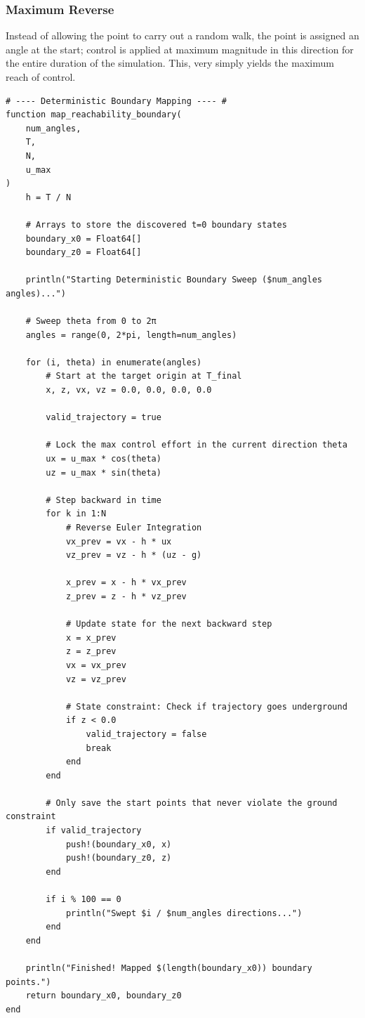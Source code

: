 \documentclass{article}
\begin{document}
\subsubsection{Maximum Reverse}
Instead of allowing the point to carry out a random walk, the point is assigned an angle at the start; control is applied at maximum magnitude in this direction for the entire duration of the simulation. This, very simply yields the maximum reach of control.

\begin{verbatim}
# ---- Deterministic Boundary Mapping ---- #
function map_reachability_boundary(
    num_angles, 
    T, 
    N, 
    u_max
)
    h = T / N
    
    # Arrays to store the discovered t=0 boundary states
    boundary_x0 = Float64[]
    boundary_z0 = Float64[]

    println("Starting Deterministic Boundary Sweep ($num_angles angles)...")

    # Sweep theta from 0 to 2π
    angles = range(0, 2*pi, length=num_angles)

    for (i, theta) in enumerate(angles)
        # Start at the target origin at T_final
        x, z, vx, vz = 0.0, 0.0, 0.0, 0.0
        
        valid_trajectory = true

        # Lock the max control effort in the current direction theta
        ux = u_max * cos(theta)
        uz = u_max * sin(theta)

        # Step backward in time
        for k in 1:N
            # Reverse Euler Integration
            vx_prev = vx - h * ux
            vz_prev = vz - h * (uz - g)
            
            x_prev = x - h * vx_prev
            z_prev = z - h * vz_prev

            # Update state for the next backward step
            x = x_prev
            z = z_prev
            vx = vx_prev
            vz = vz_prev

            # State constraint: Check if trajectory goes underground
            if z < 0.0
                valid_trajectory = false
                break
            end
        end

        # Only save the start points that never violate the ground constraint
        if valid_trajectory
            push!(boundary_x0, x)
            push!(boundary_z0, z)
        end
        
        if i % 100 == 0
            println("Swept $i / $num_angles directions...")
        end
    end

    println("Finished! Mapped $(length(boundary_x0)) boundary points.")
    return boundary_x0, boundary_z0
end 
\end{verbatim}
\end{document}

